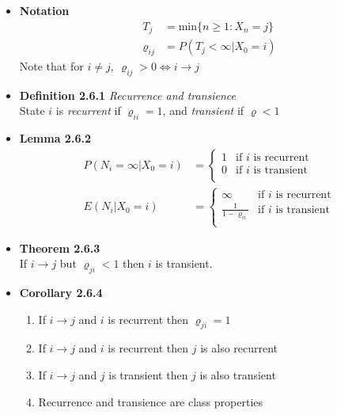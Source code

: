 \documentclass[11pt,a4paper]{article}
\begin{document}
\begin{itemize}

    \item \textbf{Notation} \\
        \begin{align*}{}
            T_j          & = \text{min}\{n \geq 1 : X_n = j\} \\
            \varrho_{ij} & = P(T_j < \infty | X_0 = i)
        \end{align*}
        Note that for $i \neq j,\ \varrho_{ij} > 0 \iff i \rightarrow j$

    \item \textbf{Definition 2.6.1} \emph{Recurrence and transience} \\
        State $i$ is \emph{recurrent} if $\varrho_{ii} = 1$, and \emph{transient} if $\varrho < 1$

    \item \textbf{Lemma 2.6.2}
        \begin{align*}{}
            P(N_i = \infty | X_0 = i) &=
            \begin{cases}{}
                1 & \text{if $i$ is recurrent} \\
                0 & \text{if $i$ is transient} \\
            \end{cases} \\
            E(N_i | X_0 = i) &=
            \begin{cases}{}
                \infty & \text{if $i$ is recurrent} \\
                \frac{1}{1 - \varrho_{ii}} & \text{if $i$ is transient} \\
            \end{cases}
        \end{align*}

    \item \textbf{Theorem 2.6.3} \\
        If $i \rightarrow j$ but $\varrho_{ji} < 1$ then $i$ is transient.

    \item \textbf{Corollary 2.6.4}
        \begin{enumerate}
            \item If $i \rightarrow j$ and $i$ is recurrent then $\varrho_{ji} = 1$
            \item If $i \rightarrow j$ and $i$ is recurrent then $j$ is also recurrent
            \item If $i \rightarrow j$ and $j$ is transient then $j$ is also transient
            \item Recurrence and transience are class properties
        \end{enumerate}


\end{itemize}
\end{document}
